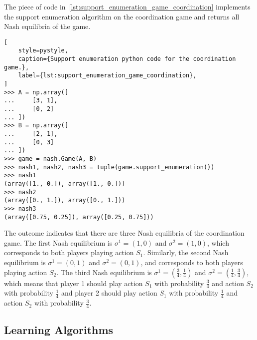 The piece of code in~\ref{lst:support_enumeration_game_coordination} implements
the support enumeration algorithm on the
coordination game and returns all Nash equilibria of the game.

\begin{lstlisting}[
    style=pystyle,
    caption={Support enumeration python code for the coordination game.},
    label={lst:support_enumeration_game_coordination},
]
>>> A = np.array([
...     [3, 1],
...     [0, 2]
... ])
>>> B = np.array([
...     [2, 1],
...     [0, 3]
... ])
>>> game = nash.Game(A, B)
>>> nash1, nash2, nash3 = tuple(game.support_enumeration())
>>> nash1
(array([1., 0.]), array([1., 0.]))
>>> nash2
(array([0., 1.]), array([0., 1.]))
>>> nash3
(array([0.75, 0.25]), array([0.25, 0.75]))

\end{lstlisting}

The outcome indicates that there are three Nash equilibria of the coordination
game.
The first Nash equilibrium is \(\sigma^1 = (1, 0)\) and \(\sigma^2 = (1, 0)\),
which corresponds to both players playing action \(S_1\).
Similarly, the second Nash equilibrium is \(\sigma^1 = (0, 1)\) and
\(\sigma^2 = (0, 1)\), and corresponds to both players playing action \(S_2\).
The third Nash equilibrium is \(\sigma^1 = (\frac{3}{4}, \frac{1}{4})\) and
\(\sigma^2 = (\frac{1}{4}, \frac{3}{4})\), which means that player 1 should
play action \(S_1\) with probability \(\frac{3}{4}\) and action \(S_2\) with
probability \(\frac{1}{4}\) and player 2 should play action \(S_1\) with
probability \(\frac{1}{4}\) and action \(S_2\) with probability
\(\frac{3}{4}\).


\subsection{Learning Algorithms}\label{sec:game_intro_learning_algorithms}


